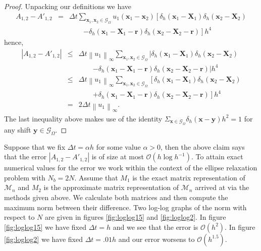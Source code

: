 \documentclass[preprint,12pt]{elsarticle}
\newcommand{\norm}[1]{\left\lVert#1\right\rVert}
\begin{document}
\begin{proof}
Unpacking our definitions we have
\begin{eqnarray}
\nonumber
A_{1,2}-A'_{1,2} &=& \Delta t
\sum_{\mathbf{x}_1,\mathbf{x}_2\in\mathcal{G}_\Omega}
u_1(\mathbf{x}_1 - \mathbf{x}_2)
\left[
\delta_h(\mathbf{x}_1 - \mathbf{X}_1)
\delta_h(\mathbf{x}_2 - \mathbf{X}_2) \right. \\ &&\qquad\left.
-
\delta_h(\mathbf{x}_1 - \mathbf{X}_1 - \mathbf{r})
\delta_h(\mathbf{x}_2 - \mathbf{X}_2 - \mathbf{r})
\right]h^4
\end{eqnarray}
hence,
\begin{eqnarray} \nonumber
|A_{1,2}-A'_{1,2}| &\leq&
\Delta t \norm{u_1}_\infty
\sum_{\mathbf{x}_1,\mathbf{x}_2\in\mathcal{G}_\Omega}
\left|
\delta_h(\mathbf{x}_1 - \mathbf{X}_1)
\delta_h(\mathbf{x}_2 - \mathbf{X}_2) \right. \\ &&\qquad\left.
-
\delta_h(\mathbf{x}_1 - \mathbf{X}_1 - \mathbf{r})
\delta_h(\mathbf{x}_2 - \mathbf{X}_2 - \mathbf{r})
\right|h^4 \\
&\leq& \nonumber
\Delta t \norm{u_1}_\infty
\sum_{\mathbf{x}_1,\mathbf{x}_2\in\mathcal{G}_\Omega}
\left[
\delta_h(\mathbf{x}_1 - \mathbf{X}_1)
\delta_h(\mathbf{x}_2 - \mathbf{X}_2) \right. \\ &&\qquad\left.
+
\delta_h(\mathbf{x}_1 - \mathbf{X}_1 - \mathbf{r})
\delta_h(\mathbf{x}_2 - \mathbf{X}_2 - \mathbf{r})
\right]h^4 \\
&=&
2\Delta t \norm{u_1}_\infty.
\end{eqnarray}
The last inequality above makes use of the identity $\Sigma_{\mathbf{x}\in\mathcal{G}_\Omega}\delta_h(\mathbf{x}-\mathbf{y})h^2=1$ for any shift $\mathbf{y}\in\mathcal{G}_\Omega$.
\end{proof}
Suppose that we fix $\Delta t = \alpha h$ for some value $\alpha>0$, then the above claim says that the error $|A_{1,2}-A'_{1,2}|$ is of size at most $\mathcal{O}(h\log h^{-1})$.
To attain exact numerical values for the error we work within the context of the ellipse relaxation problem with $N_b=2N$.
Assume that $M_1$ is the exact matrix representation of $\mathcal{M}_n$ and $M_2$ is the approximate matrix representation of $\mathcal{M}_n$ arrived at via the methods given above. We calculate both matrices and then compute the maximum norm between their difference. Two log-log graphs of the norm with respect to $N$ are given in figures \ref{fig:loglog15} and \ref{fig:loglog2}. In figure \ref{fig:loglog15} we have fixed $\Delta t = h$ and we see that the error is $\mathcal{O}(h^2)$. In figure \ref{fig:loglog2} we have fixed $\Delta t = .01h$ and our error worsens to $\mathcal{O}(h^{1.5})$.
\end{document}
